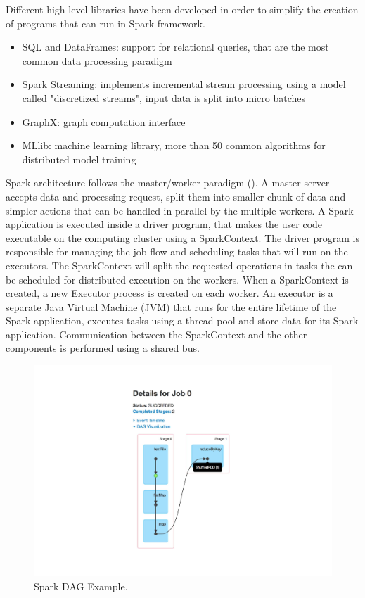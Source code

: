 Different high-level libraries have been developed in order to simplify
the creation of programs that can run in Spark framework.
\begin{itemize}
	\item SQL and DataFrames: support for relational queries, that are the most common data processing paradigm
	\item Spark Streaming: implements incremental stream processing using a model called "discretized streams", input data is split into micro batches
	\item GraphX: graph computation interface
	\item MLlib: machine learning library, more than 50 common algorithms for distributed model training
\end{itemize}
Spark architecture follows the master/worker paradigm (). A master server accepts data and processing request, split them into smaller chunk of data and simpler actions that can be handled
in parallel by the multiple workers. A Spark application is executed inside a driver program, that makes the user code executable on the computing cluster using a SparkContext. The driver program is responsible for managing the job flow and scheduling tasks that will run on the executors. The SparkContext will split the requested operations in tasks the can be scheduled for distributed execution on
the workers. When a SparkContext is created, a new Executor process is created on each worker. An executor is a separate Java Virtual Machine (JVM) that runs for the entire lifetime of the Spark application, executes tasks using a thread pool and store data for its Spark application. Communication between the SparkContext and the other
components is performed using a shared bus.
\begin{figure}
	\centering
	\includegraphics[width=\columnwidth]{Images/spark_dag_example.pdf}  
	\caption[Spark DAG Example]{Spark DAG Example.}
	\label{fig:sparkDAGExample}
\end{figure}
